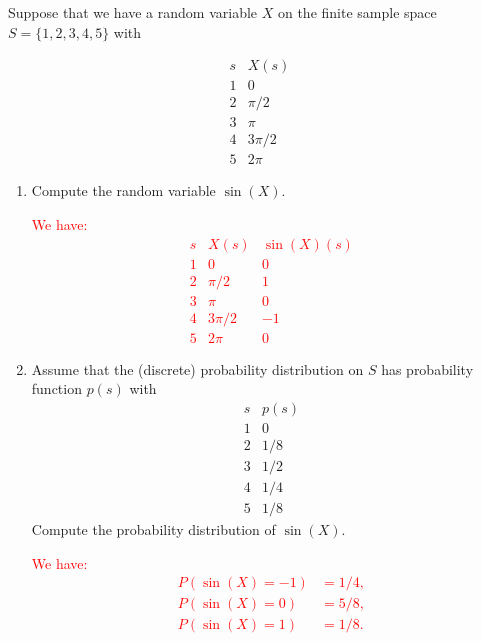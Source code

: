 \documentclass[12pt,reqno]{amsart}
\begin{document}
\bigskip
\prob Suppose that we have a random variable $X$ on the finite sample space $S = \{1,2,3,4,5\}$ with

    \[\begin{array}{c|c}
        s & X(s)  \\ \hline
        1 & 0  \\
        2 & \pi/2  \\
        3 & \pi \\
        4 & 3\pi/2 \\
        5 & 2\pi
    \end{array}\]

\medskip
\begin{enumerate}
    \item Compute the random variable $\sin{(X)}$.
    
    \bigskip
    \textcolor{red}{We have:
        \[\begin{array}{c|cc}
        s & X(s) & \sin(X)(s)  \\ \hline
        1 & 0 & 0  \\
        2 & \pi/2 & 1  \\
        3 & \pi & 0 \\
        4 & 3\pi/2 & -1 \\
        5 & 2\pi & 0
    \end{array}\]}
    \bigskip

    \item Assume that the (discrete) probability distribution on $S$ has probability function $p(s)$ with
        \[\begin{array}{c|c}
            s & p(s)  \\ \hline
            1 & 0  \\
            2 & 1/8  \\
            3 & 1/2 \\
            4 & 1/4 \\
            5 & 1/8
        \end{array}\]
    Compute the probability distribution of $\sin(X)$.

    \bigskip
    \textcolor{red}{We have:
    \begin{align*}
    P(\sin(X) = -1) &= 1/4, \\
    P(\sin(X) = 0) &= 5/8, \\
    P(\sin(X) = 1) &= 1/8. \\
    \end{align*}}
\end{enumerate}
\end{document}
